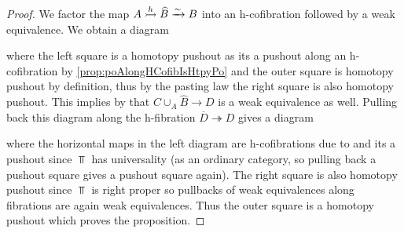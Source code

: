 \begin{prop}
\begin{proof}
        We factor the map $A\xtailrightarrow{h}\widehat{B}\xrightarrow{\sim} B$ into an h-cofibration followed by a weak equivalence.
        We obtain a diagram 
        \begin{center}
        \end{center}
        where the left square is a homotopy pushout as its a pushout along an h-cofibration by \cref{prop:poAlongHCofibIsHtpyPo} and the outer square is homotopy pushout by definition, thus by the pasting law the right square is also homotopy pushout. 
        This implies by %
        that $C\cup_{A}\widehat{B}\to D$ is a weak equivalence as well.
        Pulling back this diagram along the h-fibration $\overline{D}\twoheadrightarrow D$ gives a diagram 
        \begin{center}
        \end{center}
        where the horizontal maps in the left diagram are h-cofibrations due to %
        and its a pushout since $\Top$ has universality (as an ordinary category, so pulling back a pushout square gives a pushout square again). %
        The right square is also homotopy pushout since $\Top$ is right proper so pullbacks of weak equivalences along fibrations are again weak equivalences. 
        Thus the outer square is a homotopy pushout which proves the proposition. 
    \end{proof}
\end{prop}
